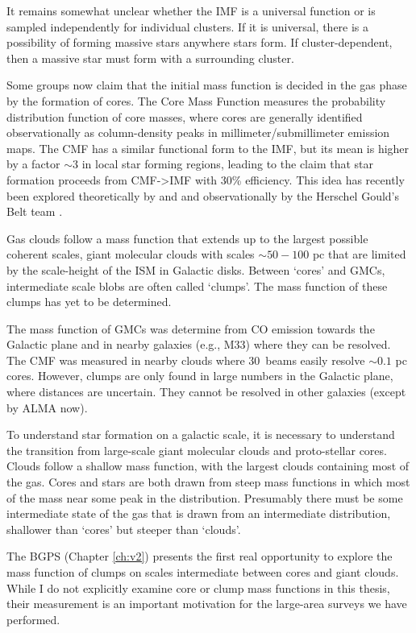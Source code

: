 It remains somewhat unclear whether the IMF is a universal function or is sampled
independently for individual clusters.  If it is universal, there is a possibility of
forming massive stars anywhere stars form.  If cluster-dependent, then a massive star
must form with a surrounding cluster.

Some groups now claim that the initial mass function is decided in the gas
phase by the formation of cores.  The Core Mass Function measures the
probability distribution function of core masses, where cores are generally
identified observationally as column-density peaks in millimeter/submillimeter
emission maps.  The CMF has a similar functional form to the IMF, but its mean
is higher by a factor $\sim3$ in local star forming regions, leading to the claim
that star formation proceeds from CMF->IMF with 30\% efficiency.
This idea has recently been explored theoretically by \citet{Chabrier2010a} and
\citet{Hopkins2012b} and observationally by the Herschel Gould's Belt team
\citep{Arzoumanian2011a,Andre2010a}.

Gas clouds follow a mass function that extends up to the largest
possible coherent scales, giant molecular clouds with scales $\sim50-100$ pc
that are limited by the scale-height of the ISM in Galactic disks.
Between `cores' and GMCs, intermediate scale blobs are often called `clumps'. 
The mass function of these clumps has yet to be determined.  

The mass function of GMCs was determine from CO emission towards the Galactic
plane and in nearby galaxies (e.g., M33) where they can be resolved.  The CMF
was measured in nearby clouds where 30\arcsec\ beams easily resolve $\sim0.1$
pc cores.  However, clumps are only found in large numbers in the Galactic
plane, where distances are uncertain.  They cannot be resolved in other
galaxies (except by ALMA now).

To understand star formation on a galactic scale, it is necessary to understand
the transition from large-scale giant molecular clouds and proto-stellar cores.
Clouds follow a shallow mass function, with the largest clouds containing most
of the gas.  Cores and stars are both drawn from steep mass functions in which
most of the mass near some peak in the distribution.  Presumably there must be
some intermediate state of the gas that is drawn from an intermediate
distribution, shallower than `cores' but steeper than `clouds'.  

The BGPS (Chapter \ref{ch:v2}) presents the first real opportunity to explore
the mass function of clumps on scales intermediate between cores and giant
clouds.   While I do not explicitly examine core or clump mass functions in this
thesis, their measurement is an important motivation for the large-area surveys
we have performed.

